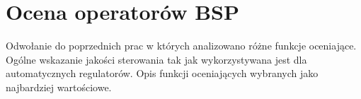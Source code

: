 \newpage
\section{Ocena operatorów BSP}
\begin{todo}
    Odwołanie do poprzednich prac w których analizowano różne funkcje oceniające. Ogólne wskazanie jakości sterowania tak jak wykorzystywana jest dla automatycznych regulatorów. Opis funkcji oceniających wybranych jako najbardziej wartościowe.
\end{todo}